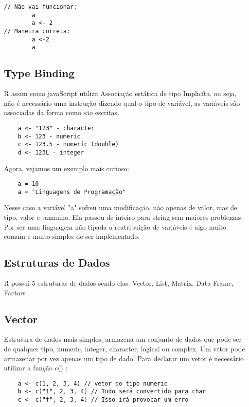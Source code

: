 \documentclass[12pt]{article}
\begin{document}
\begin{verbatim}
// Não vai funcionar:
        a
        a <- 2
// Maneira correta:
        a <-2
        a
\end{verbatim}

\subsection{Type Binding}

    R assim como javaScript utiliza Associação estática de tipo Implicíta, ou seja, não é necessário uma instrução dizendo qual o tipo de variável, as variáveis são associadas da forma como são escritas.

\begin{verbatim}
    a <- "123" - character
    b <- 123 - numeric
    c <- 123.5 - numeric (double)
    d <- 123L - integer
\end{verbatim}
    Agora, vejamos um exemplo mais curioso:
\begin{verbatim}
    a = 10
    a = "Linguagens de Programação"
\end{verbatim}

Nesse caso a variável "a" sofreu uma modificação, não apenas de valor, mas de tipo, valor e tamanho. Ela passou de inteiro para string sem maiores problemas. Por ser uma linguagem não tipada a reatribuição de variáveis é algo muito comum e muito simples de ser implementado.

\subsection{Estruturas de Dados}
R possui 5 estruturas de dados sendo elas: Vector, List, Matrix, Data Frame, Factors

\subsection{Vector}
Estrutura de dados mais simples, armazena um conjunto de dados que pode ser de qualquer tipo, numeric, integer, character, logical ou complex. Um vetor pode armazenar por vez apenas um tipo de dado.
    Para declarar um vetor é necessário utilizar a função c() :
    
    \begin{verbatim}
    a <- c(1, 2, 3, 4) // vetor do tipo numeric
    b <- c("1", 2, 3, 4) // Tudo será convertido para char
    c <- c("f", 2, 3, 4) // Isso irá provocar um erro
    \end{verbatim}
    
\end{document}
